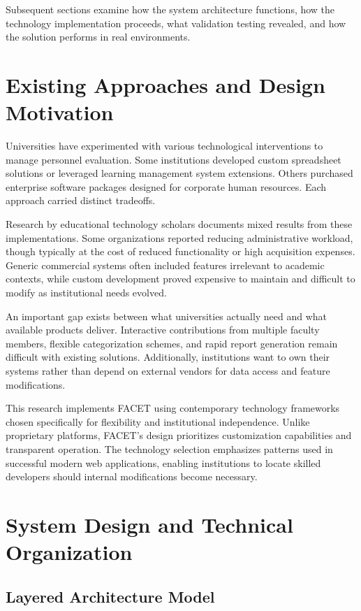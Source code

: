\documentclass[conference]{IEEEtran}
\begin{document}
Subsequent sections examine how the system architecture functions, how the technology implementation proceeds, what validation testing revealed, and how the solution performs in real environments.

\section{Existing Approaches and Design Motivation}
\label{sec:relatedwork}

Universities have experimented with various technological interventions to manage personnel evaluation. Some institutions developed custom spreadsheet solutions or leveraged learning management system extensions. Others purchased enterprise software packages designed for corporate human resources. Each approach carried distinct tradeoffs.

Research by educational technology scholars documents mixed results from these implementations. Some organizations reported reducing administrative workload, though typically at the cost of reduced functionality or high acquisition expenses. Generic commercial systems often included features irrelevant to academic contexts, while custom development proved expensive to maintain and difficult to modify as institutional needs evolved.

An important gap exists between what universities actually need and what available products deliver. Interactive contributions from multiple faculty members, flexible categorization schemes, and rapid report generation remain difficult with existing solutions. Additionally, institutions want to own their systems rather than depend on external vendors for data access and feature modifications.

This research implements FACET using contemporary technology frameworks chosen specifically for flexibility and institutional independence. Unlike proprietary platforms, FACET's design prioritizes customization capabilities and transparent operation. The technology selection emphasizes patterns used in successful modern web applications, enabling institutions to locate skilled developers should internal modifications become necessary.

\section{System Design and Technical Organization}
\label{sec:architecture}

\subsection{Layered Architecture Model}
\label{subsec:framework}
\end{document}
